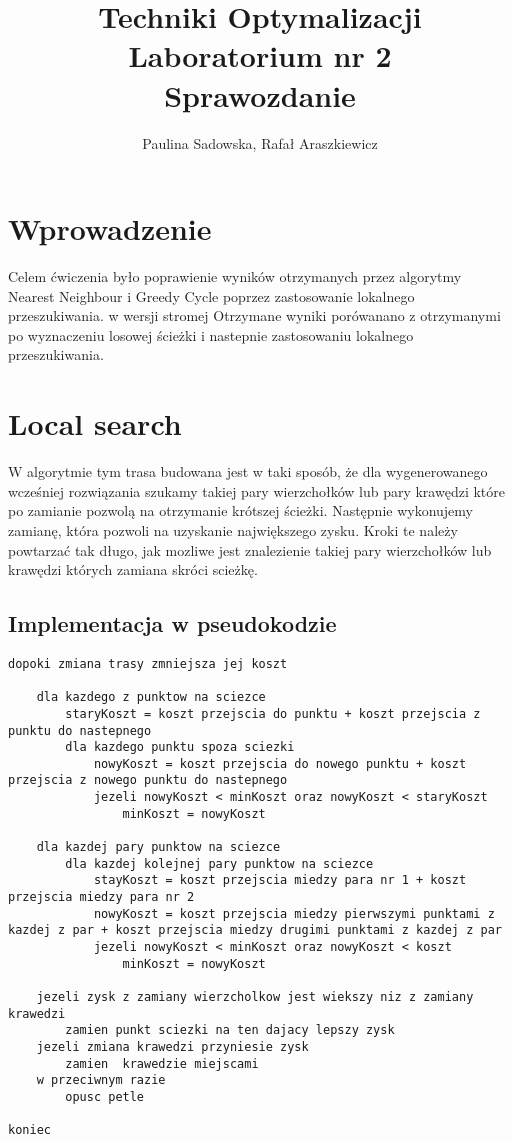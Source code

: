 \documentclass[a4paper 10pt]{article}
\title{\textbf{Techniki Optymalizacji} \\
Laboratorium nr 2 \\
Sprawozdanie}
\author{Paulina Sadowska, Rafał Araszkiewicz}
\begin{document}
\maketitle

\section{Wprowadzenie}
Celem ćwiczenia było poprawienie wyników otrzymanych przez algorytmy Nearest Neighbour i Greedy Cycle poprzez zastosowanie lokalnego przeszukiwania. w wersji stromej Otrzymane wyniki porówanano z otrzymanymi po wyznaczeniu losowej ścieżki i nastepnie zastosowaniu lokalnego przeszukiwania.
\section{Local search}
\label{Local search}
W algorytmie tym trasa budowana jest w taki sposób, że dla wygenerowanego wcześniej rozwiązania szukamy takiej pary wierzchołków lub pary krawędzi które po zamianie pozwolą na otrzymanie krótszej ścieżki. Następnie wykonujemy zamianę, która pozwoli na uzyskanie największego zysku. Kroki te należy powtarzać tak długo, jak mozliwe jest znalezienie takiej pary wierzchołków lub krawędzi których zamiana skróci scieżkę.
\subsection{Implementacja w pseudokodzie}
\begin{lstlisting}[frame=single]
dopoki zmiana trasy zmniejsza jej koszt

	dla kazdego z punktow na sciezce
		staryKoszt = koszt przejscia do punktu + koszt przejscia z punktu do nastepnego
		dla kazdego punktu spoza sciezki
			nowyKoszt = koszt przejscia do nowego punktu + koszt przejscia z nowego punktu do nastepnego
			jezeli nowyKoszt < minKoszt oraz nowyKoszt < staryKoszt
				minKoszt = nowyKoszt 
				
	dla kazdej pary punktow na sciezce
		dla kazdej kolejnej pary punktow na sciezce
			stayKoszt = koszt przejscia miedzy para nr 1 + koszt przejscia miedzy para nr 2
			nowyKoszt = koszt przejscia miedzy pierwszymi punktami z kazdej z par + koszt przejscia miedzy drugimi punktami z kazdej z par
			jezeli nowyKoszt < minKoszt oraz nowyKoszt < koszt
				minKoszt = nowyKoszt			
	
	jezeli zysk z zamiany wierzcholkow jest wiekszy niz z zamiany krawedzi
		zamien punkt sciezki na ten dajacy lepszy zysk
	jezeli zmiana krawedzi przyniesie zysk	
		zamien  krawedzie miejscami
	w przeciwnym razie
		opusc petle
	
koniec

\end{lstlisting}
\label{Local search code}
\end{document}

